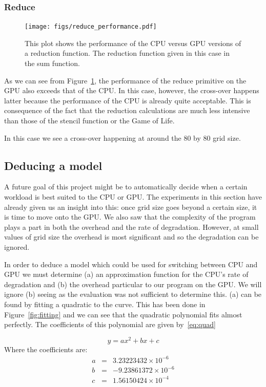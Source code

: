 \documentclass[12pt,a4paper,twoside]{scrbook}
\begin{document}
\subsubsection{Reduce}

\begin{figure}[h]
  \texttt{[image: figs/reduce\_performance.pdf]}
  \caption{This plot shows the performance of the CPU versus GPU versions of a
    reduction function. The reduction function given in this case in the sum
    function.}
  \label{fig:reduceperf}
\end{figure}

As we can see from Figure~\ref{fig:reduceperf}, the performance of the reduce
primitive on the GPU also exceeds that of the CPU. In this case, however, the
cross-over happens latter because the performance of the CPU is already quite
acceptable. This is consequence of the fact that the reduction calculations are
much less intensive than those of the stencil function or the Game of Life.

In this case we see a cross-over happening at around the 80 by 80 grid size.

\subsection{Deducing a model}

A future goal of this project might be to automatically decide when a certain
workload is best suited to the CPU or GPU. The experiments in this section have
already given us an insight into this: once grid size goes beyond a certain
size, it is time to move onto the GPU. We also saw that the complexity of the
program plays a part in both the overhead and the rate of degradation. However,
at small values of grid size the overhead is most significant and so the
degradation can be ignored.

In order to deduce a model which could be used for switching between CPU and GPU
we must determine (a) an approximation function for the CPU's rate of
degradation and (b) the overhead particular to our program on the GPU. We will
ignore (b) seeing as the evaluation was not sufficient to determine this. (a)
can be found by fitting a quadratic to the curve. This has been done in
Figure~\ref{fig:fitting} and we can see that the quadratic polynomial fits
almost perfectly. The coefficients of this polynomial are given by~\ref{eq:quad}

\begin{equation} \label{eq:quad}
y = a x^2 + b x + c
\end{equation}
Where the coefficients are:
\begin{align*}
a & = & 3.23223432 \times 10^{-6}\\
b & = & -9.23861372 \times 10^{-6}\\
c & = & 1.56150424 \times 10^{-4}\\
\end{align*}
\end{document}
